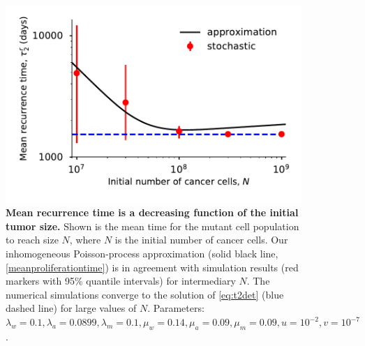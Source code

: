 \documentclass[12pt]{extarticle}
\begin{document}
\begin{figure}
\vspace*{1\baselineskip}
\includegraphics[width=1\textwidth]{Figures/ProliferationTime.pdf}
\caption{\textbf{Mean recurrence time is a decreasing function of the initial tumor size.}
Shown is the mean time for the mutant cell population to reach size $N$, where $N$ is the initial number of cancer cells.
Our inhomogeneous Poisson-process approximation (solid black line, \cref{meanproliferationtime}) is in agreement with simulation results (red markers with 95\% quantile intervals) for intermediary $N$. The numerical simulations converge to the solution of \cref{eq:t2det} (blue dashed line) for large values of $N$.  
Parameters: $\lambda_w=0.1,\lambda_a=0.0899,\lambda_m=0.1,\mu_w=0.14,\mu_a=0.09,\mu_m=0.09, u=10^{-2}, v=10^{-7}$.}
\label{proliferationFigure}
\end{figure}
\end{document}
